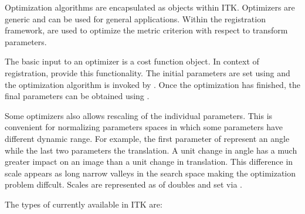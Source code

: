

Optimization algorithms are encapsulated as  objects
within ITK. Optimizers are generic and can be used for general applications.
Within the registration framework, 
are used to optimize the metric criterion with respect to transform parameters.


The basic input to an optimizer is a cost function object. In context
of registration,  provide this functionality.
The initial parameters are set using  and
the optimization algorithm is invoked by .
Once the optimization has finished, the final parameters can be obtained
using .

Some optimizers also allows rescaling of the individual parameters. This
is convenient for normalizing parameters spaces in which some parameters
have different dynamic range. For example, the first parameter of
 represent an angle while the last two parameters
the translation. A unit change in angle has a much greater impact on
an image than a unit change in translation. This difference in scale appears
as long narrow valleys in the search space making the optimization problem
diffcult. Scales are represented as  of doubles and set via
.

The types of  currently available
in ITK are:

